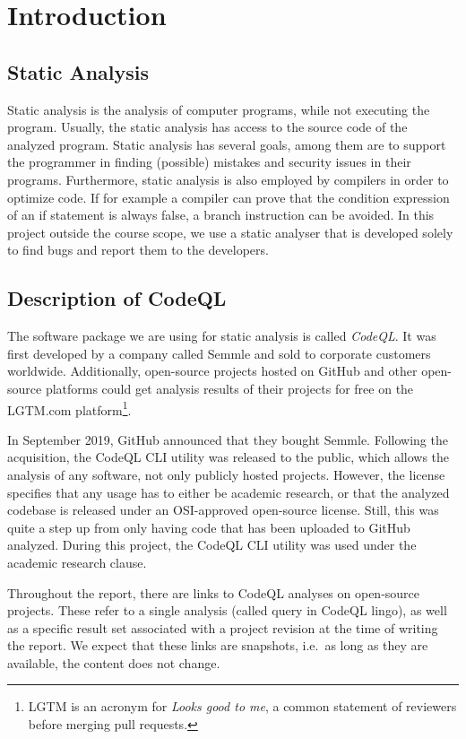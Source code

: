 \section{Introduction}
\subsection{Static Analysis}
Static analysis is the analysis of computer programs, while not executing the program.
Usually, the static analysis has access to the source code of the analyzed program.
Static analysis has several goals, among them are to support the programmer in finding (possible) mistakes and
security issues in their programs.
Furthermore, static analysis is also employed by compilers in order to optimize code.
If for example a compiler can prove that the condition expression of an if statement is always false,
a branch instruction can be avoided.
In this project outside the course scope, we use a static analyser that is developed
solely to find bugs and report them to the developers.

\subsection{Description of CodeQL}
The software package we are using for static analysis is called \emph{CodeQL}.
It was first developed by a company called Semmle and sold to corporate customers worldwide.
Additionally, open-source projects hosted on GitHub and other open-source platforms could
get analysis results of their projects for free on the LGTM.com platform\footnote{LGTM 
is an acronym for \emph{Looks good to me}, a common statement of reviewers before merging
pull requests.}.

In September 2019, GitHub announced that they bought Semmle.
Following the acquisition, the CodeQL CLI utility was released to the public,
which allows the analysis of any software, not only publicly hosted projects.
However, the license specifies that any usage has to either be academic research,
or that the analyzed codebase is released under an OSI-approved open-source license.
Still, this was quite a step up from only having code that has been uploaded to
GitHub analyzed.
During this project, the CodeQL CLI utility was used under the academic research clause.

Throughout the report, there are links to CodeQL analyses on open-source projects.
These refer to a single analysis (called query in CodeQL lingo), as well as a specific result
set associated with a project revision at the time of writing the report.
We expect that these links are snapshots, i.e.\ as long as they are available,
the content does not change.



